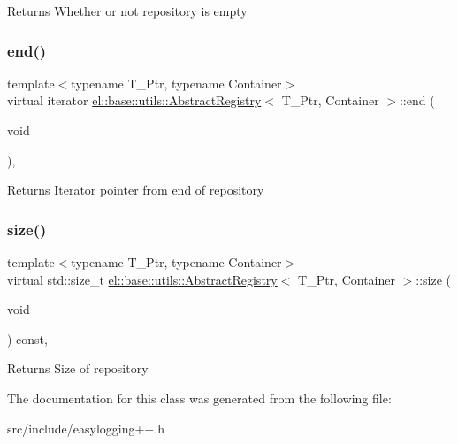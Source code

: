 \begin{DoxyReturn}{Returns}
Whether or not repository is empty 
\end{DoxyReturn}
\mbox{\label{classel_1_1base_1_1utils_1_1_abstract_registry_a67c40207c171f23ad50a71db819e84f9}} 
\subsubsection{\texorpdfstring{end()}{end()}}
{\footnotesize\ttfamily template$<$typename T\+\_\+\+Ptr, typename Container$>$ \\
virtual iterator \hyperlink{classel_1_1base_1_1utils_1_1_abstract_registry}{el\+::base\+::utils\+::\+Abstract\+Registry}$<$ T\+\_\+\+Ptr, Container $>$\+::end (\begin{DoxyParamCaption}\item[{void}]{ }\end{DoxyParamCaption})\hspace{0.3cm}{\ttfamily [inline]}, {\ttfamily [virtual]}}

\begin{DoxyReturn}{Returns}
Iterator pointer from end of repository 
\end{DoxyReturn}
\mbox{\label{classel_1_1base_1_1utils_1_1_abstract_registry_a58a7b8ea964bdf6008701dcfb6609ca5}} 
\subsubsection{\texorpdfstring{size()}{size()}}
{\footnotesize\ttfamily template$<$typename T\+\_\+\+Ptr, typename Container$>$ \\
virtual std\+::size\+\_\+t \hyperlink{classel_1_1base_1_1utils_1_1_abstract_registry}{el\+::base\+::utils\+::\+Abstract\+Registry}$<$ T\+\_\+\+Ptr, Container $>$\+::size (\begin{DoxyParamCaption}\item[{void}]{ }\end{DoxyParamCaption}) const\hspace{0.3cm}{\ttfamily [inline]}, {\ttfamily [virtual]}}

\begin{DoxyReturn}{Returns}
Size of repository 
\end{DoxyReturn}


The documentation for this class was generated from the following file\+:\begin{DoxyCompactItemize}
\item 
src/include/easylogging++.\+h\end{DoxyCompactItemize}
